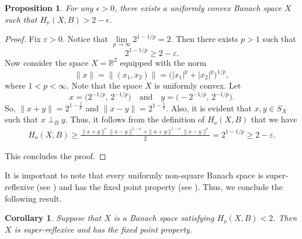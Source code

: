 \documentclass[preprint,12pt]{elsarticle}
\newtheorem{cor}[thm]{Corollary}
\newtheorem{proposition}[thm]{Proposition}
\numberwithin{equation}{section}
\begin{document}
\begin{proposition}
For any $\epsilon>0$, there  exists a uniformly convex Banach space $X$ such that $H_{\nu}(X,B)>2-\epsilon$.
\end{proposition}
\begin{proof}
Fix $\varepsilon > 0$. Notice that $\lim\limits_{p \to \infty} 2^{1 - 1/p} = 2$. Then there exists $p > 1$ such that  
\[
2^{1 - 1/p} \geq 2 - \varepsilon.
\]
Now consider the space $X = \mathbb{R}^2$ equipped with the norm
\[
\|x\| = \|(x_1, x_2)\| = \bigl( |x_1|^p + |x_2|^p \bigr)^{1/p}, 
\]
where $1 < p < \infty$. Note that the space $X$ is uniformly convex. Let 
\[
x = \bigl(2^{-1/p}, \, 2^{-1/p}\bigr) 
\quad \text{and} \quad 
y = \bigl(-2^{-1/p}, \, 2^{-1/p}\bigr).
\]
So, $\|x+y\|=2^{1-\frac{1}{p}}$ and $\|x-y\|=2^{1-\frac{1}{p}}$.
Also, it is evident that $x,y \in S_X$ such that $x \perp_B y$. Thus, it follows from the definition of $H_{\nu}(X,B)$ that we have
\begin{align*}
H_{\nu}(X,B) \geq \frac{\|x+y\|^{\nu}\|x-y\|^{1-\nu}+\|x+y\|^{1-\nu}\|x-y\|^{\nu}}{2} = 2^{1 - 1/p} \geq 2 - \varepsilon.
\end{align*}

This concludes the proof.
\end{proof}


It is important to note that every uniformly non-square Banach space is super-reflexive (see \cite{pisier2016martingales}) and has the fixed point property (see \cite{garcia2006uniformly}). Thus, we conclude the following result. 
\begin{cor}
Suppose that $X$ is a Banach space satisfying $H_\nu(X,B)< 2$. Then $X$ is super-reflexive and has the fixed point property.
\end{cor}
\end{document}
